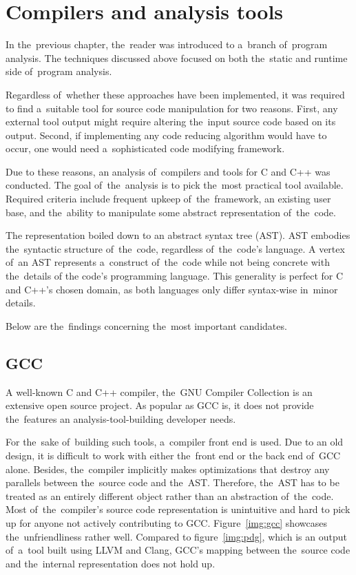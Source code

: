 \chapter{Compilers and analysis tools}

In the~previous chapter, the~reader was introduced to a~branch of~program
ana\-ly\-sis. 
The techniques discussed above focused on both the~static and runtime
side of~program analysis. 

Regardless of~whether these approaches have been implemented, it was 
required to find a~suitable tool for source code manipulation for two reasons. 
First, any external tool output might require altering the~input source code 
based on its output. 
Second, if implementing any code reducing algorithm would have to occur, 
one would need a~sophisticated code modifying framework. 

Due to these reasons, an analysis of~compilers and tools for C and C++ was conducted. 
The goal of~the~analysis is to pick the~most practical tool available. 
Required criteria include frequent upkeep of~the~framework, 
an existing user base, and the~ability to manipulate some abstract 
representation of~the~code.

The representation boiled down to an abstract syntax tree (AST). 
AST embodies the~syntactic structure of~the~code, regardless of~the~code's language. 
A vertex of~an AST represents a~construct of~the~code while not being concrete 
with the~details of the code's programming language. 
This generality is perfect for C and C++'s chosen domain, 
as both languages only differ syntax-wise in~minor details.

Below are the~findings concerning the~most important candidates.

\section{GCC}

A well-known C and C++ compiler, the~GNU Compiler Collection \citep{gcc:online} 
is an extensive
open source project. 
As popular as GCC is, it does not provide the~features an analysis-tool-building 
developer needs. 

For the~sake of~building such tools, a~compiler front end is used. 
Due to an old design, it is difficult to work with either the~front end or 
the back end of~GCC alone. 
Besides, the~compiler implicitly makes optimizations that destroy any parallels 
between the~source code and the~AST. 
Therefore, the~AST has to be treated as an entirely different object rather than 
an abstraction of~the~code. 
Most of~the~compiler's source code representation is unintuitive and 
hard to pick up for anyone not actively contributing to GCC. 
Figure~\ref{img:gcc} showcases the~unfriendliness rather well.
Compared to figure~\ref{img:pdg}, which is an output of~a~tool built using
LLVM and Clang, GCC's mapping between the~source code and the~internal
representation does not hold up.

